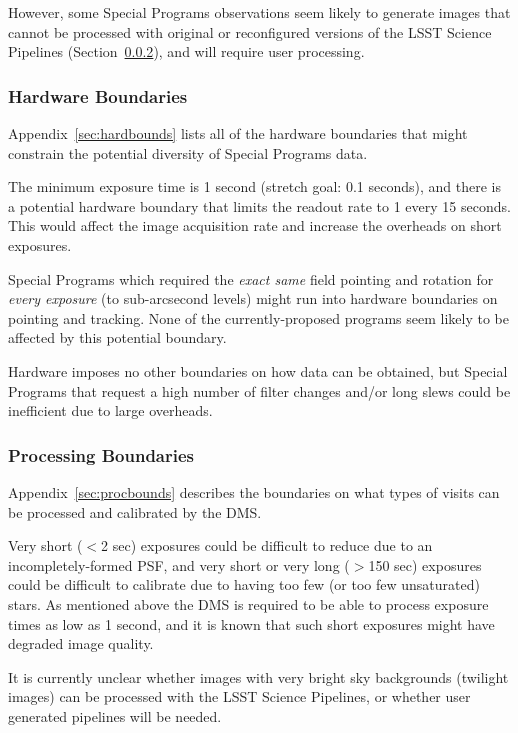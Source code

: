 However, some Special Programs observations seem likely to generate 
images that cannot be processed with original or reconfigured versions of 
the LSST Science Pipelines (Section~\ref{ssec:proc_bounds_processing}), 
and will require user processing.


\subsubsection{Hardware Boundaries}\label{ssec:proc_bounds_hardware}

Appendix~\ref{sec:hardbounds} lists all of the hardware boundaries that 
might constrain the potential diversity of Special Programs data.

The minimum exposure time is 1 second (stretch goal: 0.1 seconds), and 
there is a potential hardware boundary that limits the readout rate to 1 
every 15 seconds.
This would affect the image acquisition rate and increase the overheads 
on short exposures.

Special Programs which required the \emph{exact same} field pointing and 
rotation for \emph{every exposure} (to sub-arcsecond levels) might run 
into hardware boundaries on pointing and tracking.
None of the currently-proposed programs seem likely to be affected by 
this potential boundary. 

Hardware imposes no other boundaries on how data can be obtained, but 
Special Programs that request a high number of filter changes and/or long 
slews could be inefficient due to large overheads.


\subsubsection{Processing Boundaries}\label{ssec:proc_bounds_processing}

Appendix~\ref{sec:procbounds} describes the boundaries on what types of visits can be processed and calibrated by the DMS.

Very short ($<$2 sec) exposures could be difficult to reduce due to an 
incompletely-formed PSF, and very short or very long ($>$150 sec) 
exposures could be difficult to calibrate due to having too few (or too 
few unsaturated) stars.
As mentioned above the DMS is required to be able to process exposure 
times as low as 1 second, and it is known that such short exposures might 
have degraded image quality.

It is currently unclear whether images with very bright sky backgrounds 
(twilight images) can be processed with the LSST Science Pipelines, or 
whether user generated pipelines will be needed.

